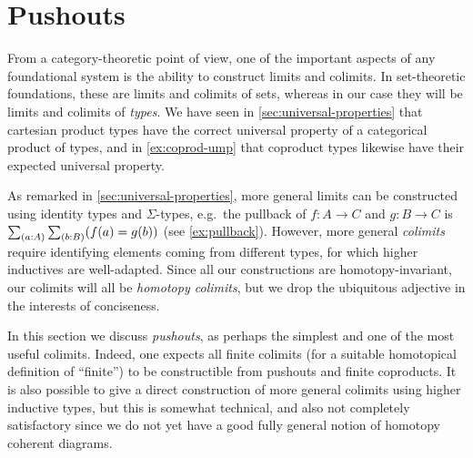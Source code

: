\section{Pushouts}
\label{sec:colimits}

From a category-theoretic point of view, one of the important aspects of any foundational system is the ability to construct limits and colimits.
In set-theoretic foundations, these are limits and colimits of sets, whereas in our case they will be limits and colimits of \emph{types}.
We have seen in \autoref{sec:universal-properties} that cartesian product types have the correct universal property of a categorical product of types, and in \autoref{ex:coprod-ump} that coproduct types likewise have their expected universal property.

As remarked in \autoref{sec:universal-properties}, more general limits can be constructed using identity types and $\Sigma$-types, e.g.\ the pullback of $f:A\to C$ and $g:B\to C$ is $\sm{a:A}{b:B} (f(a)=g(b))$ (see \autoref{ex:pullback}).
However, more general \emph{colimits} require identifying elements coming from different types, for which higher inductives are well-adapted.
Since all our constructions are homotopy-invariant, our colimits will all be \emph{homotopy colimits}, but we drop the ubiquitous adjective in the interests of conciseness.

In this section we discuss \emph{pushouts}, as perhaps the simplest and one of the most useful colimits.
Indeed, one expects all finite colimits (for a suitable homotopical definition of ``finite'') to be constructible from pushouts and finite coproducts.
It is also possible to give a direct construction of more general colimits using higher inductive types, but this is somewhat technical, and also not completely satisfactory since we do not yet have a good fully general notion of homotopy coherent diagrams.

